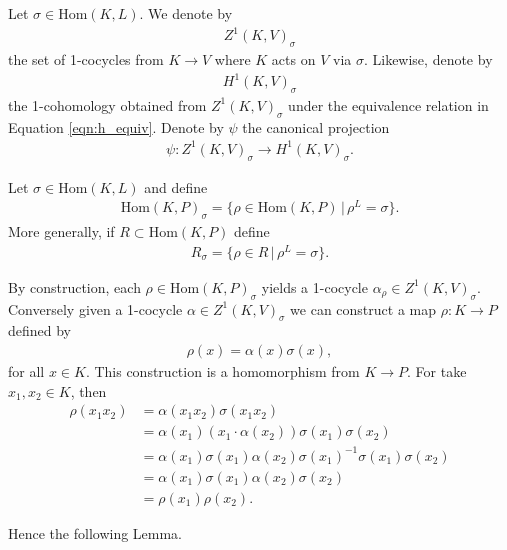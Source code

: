 \begin{definition} Let $\sigma \in \mathrm{Hom}(K, L)$. We denote by
\begin{align*} Z^1(K, V)_\sigma \end{align*}
the set of 1-cocycles from $K \rightarrow V$ where $K$ acts on $V$ via $\sigma$.
Likewise, denote by
\begin{align*} H^1(K, V)_\sigma \end{align*}
the 1-cohomology obtained from $Z^1(K, V)_\sigma$ under the equivalence relation in Equation \ref{eqn:h_equiv}. Denote by $\psi$ the canonical projection
\begin{align*} \psi : Z^1(K, V)_\sigma \rightarrow H^1(K, V)_\sigma. \end{align*}
\end{definition} 

\begin{definition} Let $\sigma \in \mathrm{Hom}(K, L)$ and define
\begin{align*} \mathrm{Hom}(K, P)_\sigma = \{ \rho \in \mathrm{Hom}(K, P) \,|\, \rho^L = \sigma\}. \end{align*}
More generally, if $R \subset \mathrm{Hom}(K, P)$ define
\begin{align*} R_\sigma = \{ \rho \in R \,|\, \rho^L = \sigma \}. \end{align*}
\end{definition}

By construction, each $\rho \in \mathrm{Hom}(K, P)_\sigma$ yields a 1-cocycle $\alpha_\rho \in Z^1(K, V)_\sigma$.
Conversely given a 1-cocycle $\alpha \in Z^1(K, V)_\sigma$ we can construct a map $\rho: K \rightarrow P$ defined by
\begin{align*}
\rho(x) = \alpha(x)\sigma(x),
\end{align*}
for all $x \in K$. This construction is a homomorphism from $K \rightarrow P$. For take $x_1, x_2 \in K$, then
\begin{align*}
  \rho(x_1 x_2) &= \alpha(x_1 x_2) \sigma(x_1 x_2) \\
  &= \alpha(x_1)(x_1 \cdot \alpha(x_2)) \sigma(x_1) \sigma(x_2) \\
  &= \alpha(x_1) \sigma(x_1) \alpha(x_2) \sigma(x_1)^{-1} \sigma(x_1) \sigma(x_2) \\
  &= \alpha(x_1) \sigma(x_1) \alpha(x_2) \sigma(x_2) \\
  &= \rho(x_1) \rho(x_2).
\end{align*}

Hence the following Lemma.


